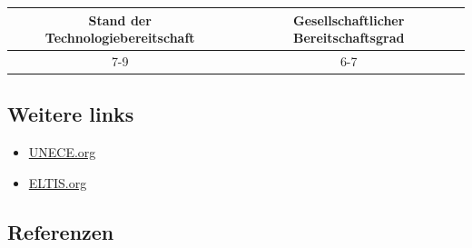 \documentclass[
]{book}
\providecommand{\tightlist}{%
  \setlength{\itemsep}{0pt}\setlength{\parskip}{0pt}}
\begin{document}
\begin{longtable}[]{@{}cc@{}}
\toprule
Stand der Technologiebereitschaft & Gesellschaftlicher Bereitschaftsgrad\tabularnewline
\midrule
\endhead
7-9 & 6-7\tabularnewline
\bottomrule
\end{longtable}

\hypertarget{weitere-links-18}{%
\subsection*{Weitere links}\label{weitere-links-18}}

\begin{itemize}
\tightlist
\item
  \href{https://unece.org/resolutions}{UNECE.org}
\item
  \href{https://www.eltis.org/resources/case-studies/rise-micromobility}{ELTIS.org}
\end{itemize}

\hypertarget{referenzen-22}{%
\subsection*{Referenzen}\label{referenzen-22}}
\end{document}
